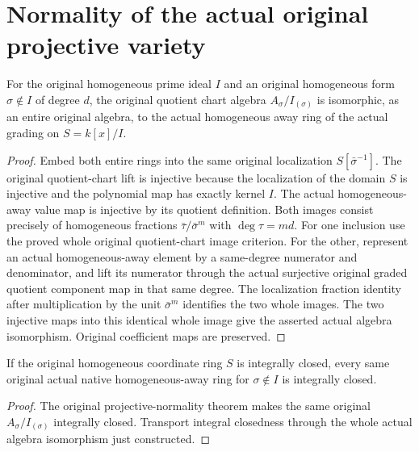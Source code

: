 \section{Normality of the actual original projective variety}

\begin{definition}
\label{def:actual-original-quotient-away-ring}
\leanok
{}
For the original homogeneous prime ideal $I$ and an original homogeneous
form $\sigma\notin I$ of degree $d$, the original quotient chart algebra
$A_\sigma/I_{(\sigma)}$ is isomorphic, as an entire original algebra, to
the actual homogeneous away ring of the actual grading on $S=k[x]/I$.
\end{definition}
\begin{proof}
Embed both entire rings into the same original localization $S[\bar\sigma^{-1}]$.
The original quotient-chart lift is injective because the localization of the
domain $S$ is injective and the polynomial map has exactly kernel $I$.
The actual homogeneous-away value map is injective by its quotient definition.
Both images consist precisely of homogeneous fractions
$\bar\tau/\bar\sigma^m$ with $\deg\tau=md$. For one inclusion use the proved
whole original quotient-chart image criterion. For the other, represent an
actual homogeneous-away element by a same-degree numerator and denominator,
and lift its numerator through the actual surjective original graded quotient
component map in that same degree. The localization fraction identity after
multiplication by the unit $\bar\sigma^m$ identifies the two whole images.
The two injective maps into this identical whole image give the asserted
actual algebra isomorphism. Original coefficient maps are preserved.
\end{proof}

\begin{theorem}
\label{thm:actual-native-projective-quotient-chart-normal}
\leanok
{}
If the original homogeneous coordinate ring $S$ is integrally closed, every
same original actual native homogeneous-away ring for $\sigma\notin I$
is integrally closed.
\end{theorem}
\begin{proof}
The original projective-normality theorem makes the same original
$A_\sigma/I_{(\sigma)}$ integrally closed. Transport integral closedness
through the whole actual algebra isomorphism just constructed.
\end{proof}

